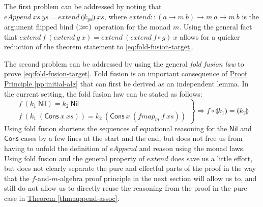 \documentclass{jfp1}
\newcommand{\fold}[1]{\llparenthesis #1 \rrparenthesis}
\newcommand{\mbind}{\mathrel{>\kern-0.45em>\kern-0.45em=}}
\newcommand{\proofprinref}[1]{\hyperref[#1]{Proof Principle \ref*{#1}}}
\newcommand{\thmref}[1]{\hyperref[#1]{Theorem \ref*{#1}}}
\begin{document}
The first problem can be addressed by noting that
$\mathit{eAppend}~\mathit{xs}~\mathit{ys} =
\mathit{extend}~\fold{k_{\mathit{ys}}}~\mathit{xs}$, where
$\mathit{extend} :: (a \to m~b) \to m~a \to m~b$ is the argument
flipped bind $(\mbind)$ operation for the monad $m$. Using the
general fact that $\mathit{extend}~f~(\mathit{extend}~g~\mathit{x}) =
\mathit{extend}~(\mathit{extend}~f \circ g)~x$ allows for a quicker
reduction of the theorem statement to \autoref{eq:fold-fusion-target}.

The second problem can be addressed by using the general \emph{fold
  fusion law} to prove \autoref{eq:fold-fusion-target}. Fold fusion is
an important consequence of \proofprinref{pp:initial-alg} that can
first be derived as an independent lemma. In the current setting, the
fold fusion law can be stated as follows:
\begin{displaymath}
  \left.
    \begin{array}{l}
      f~(k_1~\mathsf{Nil}) = k_2~\mathsf{Nil} \\
      f~(k_1~(\mathsf{Cons}~x~\mathit{xs})) = k_2~(\mathsf{Cons}~x~(\mathit{fmap_m}~f~\mathit{xs}))
    \end{array}
  \right\} \Rightarrow f \circ \fold{k_1} = \fold{k_2}
\end{displaymath}
Using fold fusion shortens the sequences of equational reasoning for
the $\mathsf{Nil}$ and $\mathsf{Cons}$ cases by a few lines at the
start and the end, but does not free us from having to unfold the
definition of $\mathit{eAppend}$ and reason using the monad
laws. Using fold fusion and the general property of $\mathit{extend}$
does save us a little effort, but does not clearly separate the pure
and effectful parts of the proof in the way that the
$f$-and-$m$-algebra proof principle in the next section will allow us
to, and still do not allow us to directly reuse the reasoning from the
proof in the pure case in \thmref{thm:append-assoc}.
\end{document}
